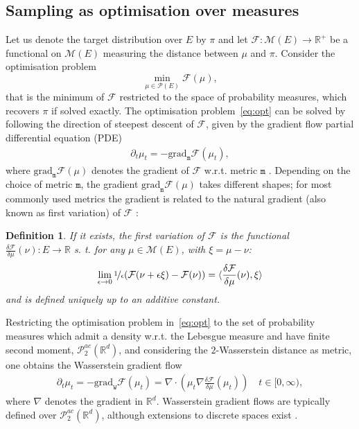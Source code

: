 \documentclass{article}
\newcommand{\cP}{\mathcal P}
\newcommand{\cM}{\mathcal M}
\newcommand{\cF}{\mathcal F}
\newcommand{\R}{\mathbb R}
\newcommand{\X}{E}
\newcommand{\m}{\mathtt m}
\newcommand{\grad}{\textrm {grad}}
\newcommand{\ssp}[1]{\langle #1 \rangle}
\newtheorem{definition}{Definition}
\begin{document}
\subsection{Sampling as optimisation over measures}
\label{sec:gf}

Let us denote the target distribution over $\X$ by $\pi$ and 
let $\cF:\cM(\X)\rightarrow \R^+$ be a functional on $\cM(\X)$ measuring the distance between $\mu$ and $\pi$. Consider the optimisation problem
\begin{equation}
\label{eq:opt}
    \min_{\mu \in \cP(\X)} \cF(\mu),
\end{equation}
that is the minimum of $\cF$ restricted to the space of probability measures, which recovers $\pi$ if solved exactly.
The optimisation problem~\eqref{eq:opt} can be solved by following the direction of steepest descent of $\cF$, given by the gradient flow partial differential equation (PDE)
\begin{align}
    \label{eq:pde}
    \partial_t\mu_t = -\grad_{\m} \cF(\mu_t),
\end{align}
where $\grad_{\m} \cF(\mu)$ denotes the gradient of $\cF$ w.r.t. metric $\m$ \citep{ambrosio2008gradient,carrillo_fisher-rao_2024}.
Depending on the choice of metric $\m$, the gradient $\grad_{\m}\cF(\mu)$ takes different shapes; for most commonly used metrics the gradient is related to the natural gradient (also known as first variation) of $\cF$ \citep{amari1998natural}:
\begin{definition}\label{def:first_var}
If it exists, the first variation of $\cF$ is the functional $\frac{\delta \cF}{\delta \mu}(\nu):\X \rightarrow \R$ s. t. for any $\mu \in \cM(\X)$, with $\xi = \mu-\nu$:
\begin{equation}
\label{eq:first_var}
\lim_{\epsilon \rightarrow 0}\nicefrac{1}{\epsilon}(\cF(\nu+\epsilon  \xi) -\cF(\nu))%
=\ssp{\frac{\delta \cF}{\delta \mu}(\nu), \xi}
\end{equation} 
and is defined uniquely up to an additive constant.
\end{definition}

Restricting the optimisation problem in~\eqref{eq:opt} to the set of probability measures which admit a density w.r.t. the Lebesgue measure and have finite second moment, $\mathcal{P}_2^{ac}(\R^d)$, and considering the
$2$-Wasserstein distance as metric, one obtains the Wasserstein gradient flow \citep{ambrosio2008gradient}
\begin{align*}
    \partial_t \mu_t=  -\grad_{\mathtt{W}}\cF(\mu_t)= \nabla \cdot \left( \mu_t\nabla \frac{\delta \cF}{\delta \mu}(\mu_t) \right)  \quad t \in [0,\infty),
\end{align*}
where $\nabla $ denotes the gradient in $\R^d$.
Wasserstein gradient flows are typically defined over $\mathcal{P}_2^{ac}(\R^d)$, although extensions to discrete spaces exist \citep{sun2023discrete}.
\end{document}
